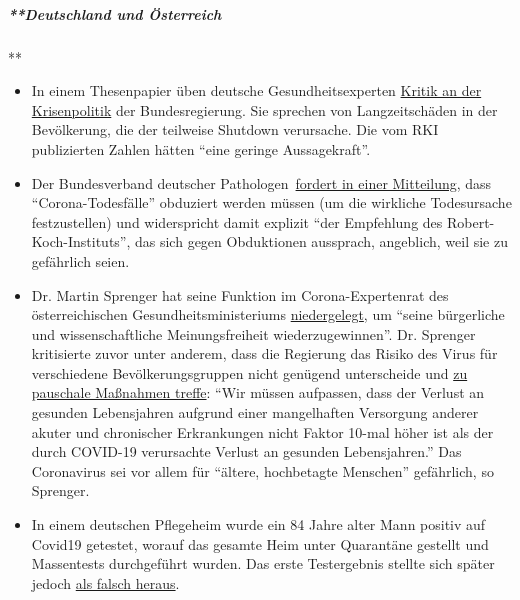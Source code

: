 \hypertarget{deutschland-und-uxf6sterreich-1}{%
\subparagraph{**Deutschland und
Österreich}\label{deutschland-und-uxf6sterreich-1}}

**

\begin{itemize}
\tightlist
\item
  In einem Thesenpapier üben deutsche Gesundheitsexperten
  \href{https://www.tagesschau.de/investigativ/ndr-wdr/corona-experten-thesenpapier-101.html}{Kritik
  an der Krisenpolitik} der Bundesregierung. Sie sprechen von
  Langzeitschäden in der Bevölkerung, die der teilweise Shutdown
  verursache. Die vom RKI publizierten Zahlen hätten ``eine geringe
  Aussagekraft''.
\item
  Der Bundesverband deutscher
  Pathologen~\href{https://www.pathologie-dgp.de/die-dgp/aktuelles/meldung/pressemitteilung-an-corona-verstorbene-sollten-obduziert-werden/}{fordert
  in einer Mitteilung}, dass ``Corona-Todesfälle'' obduziert werden
  müssen (um die wirkliche Todesursache festzustellen) und widerspricht
  damit explizit ``der Empfehlung des Robert-Koch-Instituts'', das sich
  gegen Obduktionen aussprach, angeblich, weil sie zu gefährlich seien.
\item
  Dr. Martin Sprenger hat seine Funktion im Corona-Expertenrat des
  österreichischen Gesund­heits­ministeriums
  \href{https://mailchi.mp/addendum/fles-home-office-260342}{niedergelegt},
  um ``seine bürgerliche und wissen­schaftliche Meinungs­freiheit
  wiederzugewinnen''. Dr. Sprenger kritisierte zuvor unter anderem, dass
  die Regierung das Risiko des Virus für verschiedene
  Bevölkerungs­­gruppen nicht genügend unterscheide und
  \href{https://www.addendum.org/coronavirus/interview-sprenger/}{zu
  pauschale Maßnahmen treffe}: ``Wir müssen aufpassen, dass der Verlust
  an gesunden Lebensjahren aufgrund einer mangelhaften Versorgung
  anderer akuter und chronischer Erkrankungen nicht Faktor 10-mal höher
  ist als der durch COVID-19 verursachte Verlust an gesunden
  Lebensjahren.'' Das Coronavirus sei vor allem für ``ältere,
  hochbetagte Menschen'' gefährlich, so Sprenger.\\
\item
  In einem deutschen Pflegeheim wurde ein 84 Jahre alter Mann positiv
  auf Covid19 getestet, worauf das gesamte Heim unter Quarantäne
  gestellt und Massen­tests durchgeführt wurden. Das erste Testergebnis
  stellte sich später jedoch
  \href{https://www.schwerin.de/news/4a3e5560-78c9-11ea-b543-1967de695b51/}{als
  falsch heraus}.
\end{itemize}

